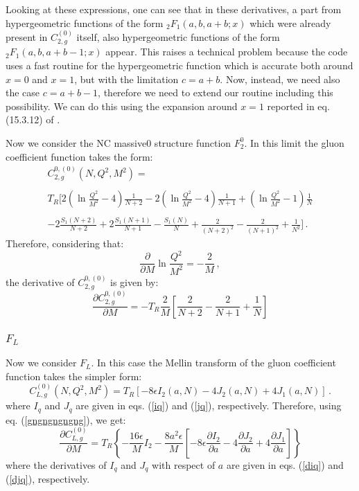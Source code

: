\documentclass[10pt,a4paper]{article}
\begin{document}
Looking at these expressions, one can see that in these derivatives, a part from hypergeometric functions of the form ${_2F_1(a,b,a+b;x)}$ which were already present in $C_{2,g}^{(0)}$ itself, also hypergeometric functions of the form ${_2F_1(a,b,a+b-1;x)}$ appear. This raises a technical problem because the code uses a fast routine for the hypergeometric function which is accurate both around $x=0$ and $x=1$, but with the limitation $c=a+b$. Now, instead, we need also the case ${c=a+b-1}$, therefore we need to extend our routine including this possibility. We can do this using the expansion around $x=1$ reported in eq. (15.3.12) of \cite{AbramowitzStegun}.

Now we consider the NC massive0 structure function $F_2^0$. In this limit the gluon coefficient function takes the form:
\begin{equation}
\begin{array}{c}
\displaystyle C_{2,g}^{0,(0)}(N,Q^2,M^2)=\\
\\
\displaystyle T_R\Bigg[2\left(\ln\frac{Q^2}{M^2}-4\right)\frac1{N+2}-2\left(\ln\frac{Q^2}{M^2}-4\right)\frac1{N+1}+\left(\ln\frac{Q^2}{M^2}-1\right)\frac1N\\
\\
\displaystyle -2\frac{S_1(N+2)}{N+2}+2\frac{S_1(N+1)}{N+1}-\frac{S_1(N)}{N}+\frac2{(N+2)^2}-\frac2{(N+1)^2}+\frac1{N^2}\Bigg]\,.
\end{array}
\end{equation}
Therefore, considering that:
\begin{equation}
\frac{\partial}{\partial M} \ln\frac{Q^2}{M^2} = - \frac2M\,,
\end{equation}
the derivative of $C_{2,g}^{0,(0)}$ is given by:
\begin{equation}
\frac{\partial C_{2,g}^{0,(0)}}{\partial M}= -T_R\frac{2}{M}\left[\frac2{N+2}-\frac2{N+1}+\frac1N\right]
\end{equation}

\subsubsection{$F_L$}

Now we consider $F_L$. In this case the Mellin transform of the gluon coefficient function takes the simpler form:
\begin{equation}\label{cgnf1L}
C_{L,g}^{(0)}\left(N,Q^2,M^2\right)= T_R\left[-8\epsilon I_2(a,N)-4J_2(a,N)+4J_1(a,N)\right]\,.
\end{equation}
where $I_q$ and $J_q$ are given in eqs. (\ref{iq}) and (\ref{jq}), respectively. Therefore, using eq. (\ref{gngngngngng}), we get:
\begin{equation}
\frac{\partial C_{L,g}^{(0)}}{\partial M}= T_R\left\{-\frac{16\epsilon}{M} I_2 -\frac{8a^2\epsilon}{M}\left[-8\epsilon \frac{\partial I_2}{\partial a}-4\frac{\partial J_2}{\partial a}+4\frac{\partial J_1}{\partial a}\right]\right\}
\end{equation}
where the derivatives of $I_q$ and $J_q$ with respect of $a$ are given in eqs. (\ref{diq}) and (\ref{djq}), respectively.
\end{document}
